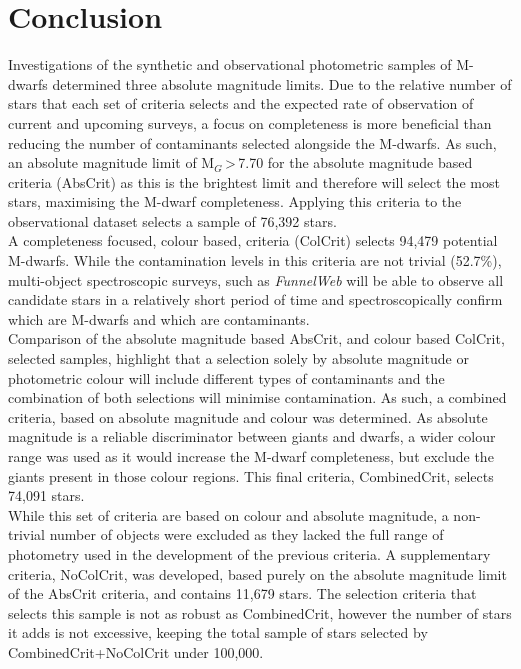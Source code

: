 \section{Conclusion}
Investigations of the synthetic and observational photometric samples of M-dwarfs determined three absolute magnitude limits. Due to the relative number of stars that each set of criteria selects and the expected rate of observation of current and upcoming surveys, a focus on completeness is more beneficial than reducing the number of contaminants selected alongside the M-dwarfs. As such, an absolute magnitude limit of M$_G$\,\textgreater\,7.70 for the absolute magnitude based criteria (AbsCrit) as this is the brightest limit and therefore will select the most stars, maximising the M-dwarf completeness. Applying this criteria to the observational dataset selects a sample of 76,392 stars.\\

A completeness focused, colour based, criteria (ColCrit) selects 94,479 potential M-dwarfs. While the contamination levels in this criteria are not trivial (52.7\%), multi-object spectroscopic surveys, such as {\em FunnelWeb} will be able to observe all candidate stars in a relatively short period of time and spectroscopically confirm which are M-dwarfs and which are contaminants.\\

Comparison of the absolute magnitude based AbsCrit, and colour based ColCrit, selected samples, highlight that a selection solely by absolute magnitude or photometric colour will include different types of contaminants and the combination of both selections will minimise contamination. As such, a combined criteria, based on absolute magnitude and colour was determined. As absolute magnitude is a reliable discriminator between giants and dwarfs, a wider colour range was used as it would increase the M-dwarf completeness, but exclude the giants present in those colour regions. This final criteria, CombinedCrit, selects 74,091 stars.\\

While this set of criteria are based on colour and absolute magnitude, a non-trivial number of objects were excluded as they lacked the full range of photometry used in the development of the previous criteria. A supplementary criteria, NoColCrit, was developed, based purely on the absolute magnitude limit of the AbsCrit criteria, and contains 11,679 stars. The selection criteria that selects this sample is not as robust as CombinedCrit, however the number of stars it adds is not excessive, keeping the total sample of stars selected by CombinedCrit+NoColCrit under 100,000.\\